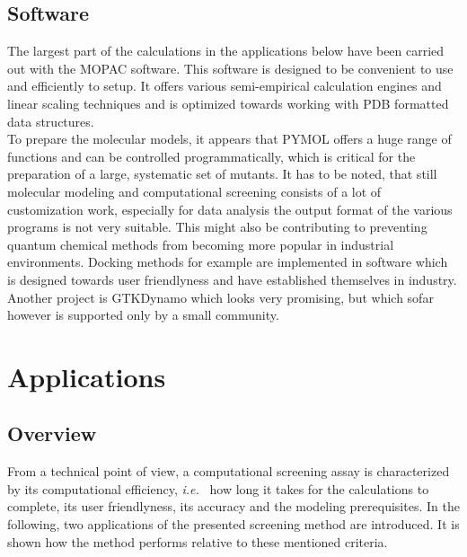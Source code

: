 \subsection{Software}\label{sec:software}
The largest part of the calculations in the applications below have been carried out with the MOPAC software\cite{stewart1990mopac}.
This software is designed to be convenient to use and efficiently to setup.
It offers various semi-empirical calculation engines and linear scaling techniques and is optimized towards working with PDB formatted data structures.\\
To prepare the molecular models, it appears that PYMOL offers a huge range of functions and can be controlled programmatically, which is critical for the preparation of a large, systematic set of mutants.
It has to be noted, that still molecular modeling and computational screening consists of a lot of customization work, especially for data analysis the output format of the various programs is not very suitable.
This might also be contributing to preventing quantum chemical methods from becoming more popular in industrial environments.
Docking methods for example are implemented in software which is designed towards user friendlyness and have established themselves in industry.
Another project is GTKDynamo which looks very promising, but which sofar however is supported only by a small community\cite{bachega2013gtkdynamo}.




\clearpage
\section{Applications}\label{sec:apps}

\subsection{Overview}\label{sec:overview}
From a technical point of view, a computational screening assay is characterized by its computational efficiency, \textit{i.e. } how long it takes for the calculations to complete, its user friendlyness, its accuracy and the modeling prerequisites.
In the following, two applications of the presented screening method are introduced.
It is shown how the method performs relative to these mentioned criteria.

